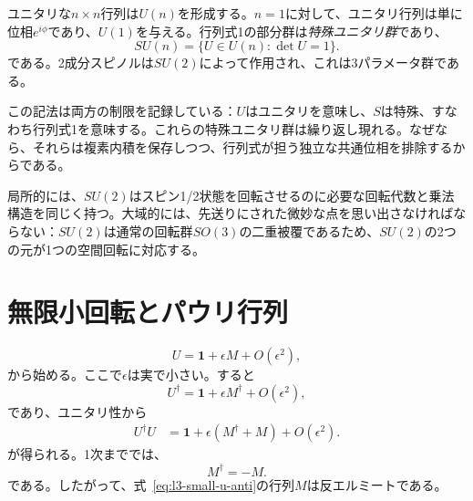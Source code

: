 \begin{classroomqa}
\end{classroomqa}

ユニタリな\(n\times n\)行列は\(U(n)\)を形成する。\(n=1\)に対して、ユニタリ行列は単に位相\(e^{i\phi}\)であり、\(U(1)\)を与える。行列式1の部分群は\emph{特殊ユニタリ群}であり、
\begin{equation}
SU(n)=\{U\in U(n):\det U=1\}.
\end{equation}
である。2成分スピノルは\(SU(2)\)によって作用され、これは3パラメータ群である。

この記法は両方の制限を記録している：\(U\)はユニタリを意味し、\(S\)は特殊、すなわち行列式1を意味する。これらの特殊ユニタリ群は繰り返し現れる。なぜなら、それらは複素内積を保存しつつ、行列式が担う独立な共通位相を排除するからである。

局所的には、\(SU(2)\)はスピン1/2状態を回転させるのに必要な回転代数と乗法構造を同じく持つ。大域的には、先送りにされた微妙な点を思い出さなければならない：\(SU(2)\)は通常の回転群\(SO(3)\)の二重被覆であるため、\(SU(2)\)の2つの元が1つの空間回転に対応する。

\section{無限小回転とパウリ行列}

\begin{classroomqa}
\end{classroomqa}


\begin{equation}
U=\boldsymbol 1+\epsilon M+O(\epsilon^2),
\label{eq:l3-small-u-anti}
\end{equation}
から始める。ここで\(\epsilon\)は実で小さい。すると
\begin{equation}
U^\dagger=\boldsymbol 1+\epsilon M^\dagger+O(\epsilon^2),
\end{equation}
であり、ユニタリ性から
\begin{align}
U^\dagger U
 &=\boldsymbol 1+\epsilon(M^\dagger+M)+O(\epsilon^2).
\end{align}
が得られる。1次まででは、
\begin{equation}
M^\dagger=-M.
\end{equation}
である。したがって、式~\eqref{eq:l3-small-u-anti}の行列\(M\)は反エルミートである。

